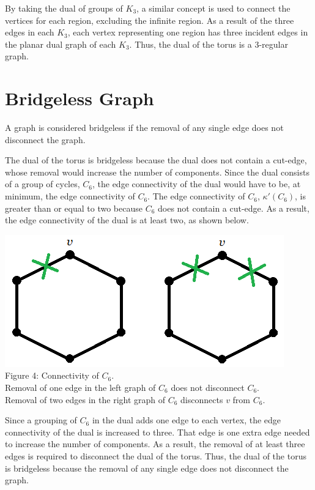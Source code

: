 \documentclass[12pt]{article}
\begin{document}
\begin{flushleft}
\medskip
By taking the dual of groups of $K_3$, a similar concept is used to connect the vertices for each region, excluding the infinite region. As a result of the three edges in each $K_3$, each vertex representing one region has three incident edges in the planar dual graph of each $K_3$. Thus, the dual of the torus is a 3-regular graph.

\section*{Bridgeless Graph}
A graph is considered bridgeless if the removal of any single edge does not disconnect the graph.

\medskip
The dual of the torus is bridgeless because the dual does not contain a cut-edge, whose removal would increase the number of components. Since the dual consists of a group of cycles, $C_6$, the edge connectivity of the dual would have to be, at minimum, the edge connectivity of $C_6$. The edge connectivity of $C_6$, $\kappa'(C_6)$, is greater than or equal to two because $C_6$ does not contain a cut-edge. As a result, the edge connectivity of the dual is at least two, as shown below.

\begin{center}
\includegraphics[scale=1]{images/c6connectivity.png}\\
Figure 4: Connectivity of $C_6$.\\
Removal of one edge in the left graph of $C_6$ does not disconnect $C_6$.\\
Removal of two edges in the right graph of $C_6$ disconnects $v$ from $C_6$.
\end{center}

\medskip
Since a grouping of $C_6$ in the dual adds one edge to each vertex, the edge connectivity of the dual is increased to three. That edge is one extra edge needed to increase the number of components. As a result, the removal of at least three edges is required to disconnect the dual of the torus. Thus, the dual of the torus is bridgeless because the removal of any single edge does not disconnect the graph.


\end{flushleft}
\end{document}
